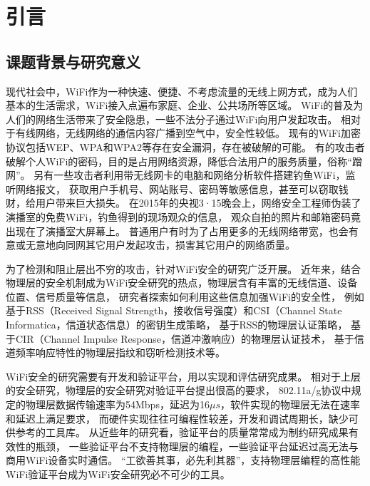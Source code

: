 
\chapter{引言}
	\section{课题背景与研究意义}

		现代社会中，WiFi作为一种快速、便捷、不考虑流量的无线上网方式，成为人们基本的生活需求，WiFi接入点遍布家庭、企业、公共场所等区域。
		WiFi的普及为人们的网络生活带来了安全隐患，一些不法分子通过WiFi向用户发起攻击。
		相对于有线网络，无线网络的通信内容广播到空气中，安全性较低。
		现有的WiFi加密协议包括WEP、WPA和WPA2等存在安全漏洞，存在被破解的可能\cite{wisec09wep}。
		有的攻击者破解个人WiFi的密码，目的是占用网络资源，降低合法用户的服务质量，俗称“蹭网”。
		另有一些攻击者利用带无线网卡的电脑和网络分析软件搭建钓鱼WiFi，监听网络报文，
		获取用户手机号、网站账号、密码等敏感信息，甚至可以窃取钱财，给用户带来巨大损失。
		在2015年的央视3·15晚会上，网络安全工程师伪装了演播室的免费WiFi，钓鱼得到的现场观众的信息，
		观众自拍的照片和邮箱密码竟出现在了演播室大屏幕上\cite{cctv315}。
		普通用户有时为了占用更多的无线网络带宽，也会有意或无意地向同网其它用户发起攻击，损害其它用户的网络质量\cite{tifs12reciprocity}。

		为了检测和阻止层出不穷的攻击，针对WiFi安全的研究广泛开展。
		近年来，结合物理层的安全机制成为WiFi安全研究的热点，物理层含有丰富的无线信道、设备位置、信号质量等信息，
		研究者探索如何利用这些信息加强WiFi的安全性，
		例如基于RSS（Received Signal Strength，接收信号强度）和CSI（Channel State Informatica，信道状态信息）的密钥生成策略\cite{access16key}，
		基于RSS的物理层认证策略\cite{ieeewc10noncryp}，
		基于CIR（Channel Impulse Response，信道冲激响应）的物理层认证技术\cite{milcom11cir, icc13cir}，
		基于信道频率响应特性的物理层指纹和窃听检测技术\cite{icc07xiao, globecom10xiao}等。

		WiFi安全的研究需要有开发和验证平台，用以实现和评估研究成果。
		相对于上层的安全研究，物理层的安全研究对验证平台提出很高的要求，
		802.11a/g协议中规定的物理层数据传输速率为54Mbps，延迟为16$\mu s$，软件实现的物理层无法在速率和延迟上满足要求，
		而硬件实现往往可编程性较差，开发和调试周期长，缺少可供参考的工具库。
		从近些年的研究看，验证平台的质量常常成为制约研究成果有效性的瓶颈，
		一些验证平台不支持物理层的编程，一些验证平台延迟过高无法与商用WiFi设备实时通信\cite{mobicom13securearray}。
		“工欲善其事，必先利其器”，支持物理层编程的高性能WiFi验证平台成为WiFi安全研究必不可少的工具。


